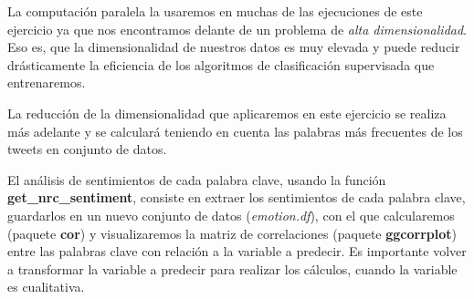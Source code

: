 \documentclass[
]{article}
\newenvironment{Shaded}{\begin{snugshade}}{\end{snugshade}}
\newcommand{\CharTok}[1]{\textcolor[rgb]{0.31,0.60,0.02}{#1}}
\newcommand{\DataTypeTok}[1]{\textcolor[rgb]{0.13,0.29,0.53}{#1}}
\newcommand{\DecValTok}[1]{\textcolor[rgb]{0.00,0.00,0.81}{#1}}
\newcommand{\KeywordTok}[1]{\textcolor[rgb]{0.13,0.29,0.53}{\textbf{#1}}}
\newcommand{\NormalTok}[1]{#1}
\newcommand{\OperatorTok}[1]{\textcolor[rgb]{0.81,0.36,0.00}{\textbf{#1}}}
\newcommand{\OtherTok}[1]{\textcolor[rgb]{0.56,0.35,0.01}{#1}}
\newcommand{\StringTok}[1]{\textcolor[rgb]{0.31,0.60,0.02}{#1}}
\begin{document}
La computación paralela la usaremos en muchas de las ejecuciones de este
ejercicio ya que nos encontramos delante de un problema de \emph{alta
dimensionalidad}. Eso es, que la dimensionalidad de nuestros datos es
muy elevada y puede reducir drásticamente la eficiencia de los
algoritmos de clasificación supervisada que entrenaremos.

La reducción de la dimensionalidad que aplicaremos en este ejercicio se
realiza más adelante y se calculará teniendo en cuenta las palabras más
frecuentes de los tweets en conjunto de datos.

El análisis de sentimientos de cada palabra clave, usando la función
\textbf{get\_nrc\_sentiment}, consiste en extraer los sentimientos de
cada palabra clave, guardarlos en un nuevo conjunto de datos
(\emph{emotion.df}), con el que calcularemos (paquete \textbf{cor}) y
visualizaremos la matriz de correlaciones (paquete \textbf{ggcorrplot})
entre las palabras clave con relación a la variable a predecir. Es
importante volver a transformar la variable a predecir para realizar los
cálculos, cuando la variable es cualitativa.

\begin{Shaded}
\end{Shaded}
\end{document}
